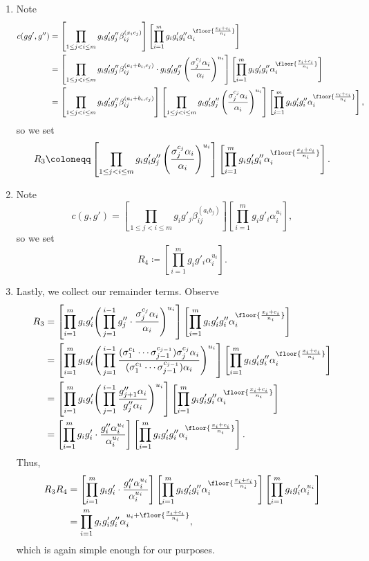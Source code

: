 \documentclass{article}
\numberwithin{equation}{section}
\begin{document}
\begin{enumerate}
	\item Note
	\begin{align*}
		c(gg',g'') &= \left[\prod_{1\le j<i\le m}g_ig'_ig''_j\beta_{ij}^{(x_ic_j)}\right]\left[\prod_{i=1}^mg_ig'_ig''_i\alpha_i^{\floor{\frac{x_i+c_i}{n_i}}}\right] \\
		&= \left[\prod_{1\le j<i\le m}g_ig'_ig''_j\beta_{ij}^{(a_i+b_i,c_j)}\cdot g_ig'_ig''_j\left(\frac{\sigma_j^{c_j}\alpha_i}{\alpha_i}\right)^{u_i}\right]\left[\prod_{i=1}^mg_ig'_ig''_i\alpha_i^{\floor{\frac{x_i+c_i}{n_i}}}\right] \\
		&= \left[\prod_{1\le j<i\le m}g_ig'_ig''_j\beta_{ij}^{(a_i+b_i,c_j)}\right]\left[\prod_{1\le j<i\le m}g_ig'_ig''_j\left(\frac{\sigma_j^{c_j}\alpha_i}{\alpha_i}\right)^{u_i}\right]\left[\prod_{i=1}^mg_ig'_ig''_i\alpha_i^{\floor{\frac{x_i+c_i}{n_i}}}\right],
	\end{align*}
	so we set
	\[R_3\coloneqq\left[\prod_{1\le j<i\le m}g_ig'_ig''_j\left(\frac{\sigma_j^{c_j}\alpha_i}{\alpha_i}\right)^{u_i}\right]\left[\prod_{i=1}^mg_ig'_ig''_i\alpha_i^{\floor{\frac{x_i+c_i}{n_i}}}\right].\]
	\item Note
	\[c(g,g') = \left[\prod_{1\le j<i\le m}g_ig'_j\beta_{ij}^{(a_ib_j)}\right]\left[\prod_{i=1}^mg_ig'_i\alpha_i^{u_i}\right],\]
	so we set
	\[R_4\coloneqq\left[\prod_{i=1}^mg_ig'_i\alpha_i^{u_i}\right].\]
	\item Lastly, we collect our remainder terms. Observe
	\begin{align*}
		R_3 &= \left[\prod_{i=1}^mg_ig'_i\Bigg(\prod_{j=1}^{i-1}g''_j\cdot\frac{\sigma_j^{c_j}\alpha_i}{\alpha_i}\Bigg)^{u_i}\right]\left[\prod_{i=1}^mg_ig'_ig''_i\alpha_i^{\floor{\frac{x_i+c_i}{n_i}}}\right] \\
		&= \left[\prod_{i=1}^mg_ig'_i\Bigg(\prod_{j=1}^{i-1}\frac{(\sigma_1^{c_1}\cdots\sigma_{j-1}^{c_{j-1}})\sigma_j^{c_j}\alpha_i}{(\sigma_1^{c_1}\cdots\sigma_{j-1}^{c_{j-1}})\alpha_i}\Bigg)^{u_i}\right]\left[\prod_{i=1}^mg_ig'_ig''_i\alpha_i^{\floor{\frac{x_i+c_i}{n_i}}}\right] \\
		&= \left[\prod_{i=1}^mg_ig'_i\Bigg(\prod_{j=1}^{i-1}\frac{g''_{j+1}\alpha_i}{g''_j\alpha_i}\Bigg)^{u_i}\right]\left[\prod_{i=1}^mg_ig'_ig''_i\alpha_i^{\floor{\frac{x_i+c_i}{n_i}}}\right] \\
		&= \left[\prod_{i=1}^mg_ig'_i\cdot\frac{g''_i\alpha_i^{u_i}}{\alpha_i^{u_i}}\right]\left[\prod_{i=1}^mg_ig'_ig''_i\alpha_i^{\floor{\frac{x_i+c_i}{n_i}}}\right].
	\end{align*}
	Thus,
	\begin{align*}
		R_3R_4 &= \left[\prod_{i=1}^mg_ig'_i\cdot\frac{g''_i\alpha_i^{u_i}}{\alpha_i^{u_i}}\right]\left[\prod_{i=1}^mg_ig'_ig''_i\alpha_i^{\floor{\frac{x_i+c_i}{n_i}}}\right]\left[\prod_{i=1}^mg_ig'_i\alpha_i^{u_i}\right] \\
		&= \prod_{i=1}^mg_ig'_ig''_i\alpha_i^{u_i+\floor{\frac{x_i+c_i}{n_i}}},
	\end{align*}
	which is again simple enough for our purposes.
\end{enumerate}
\end{document}
